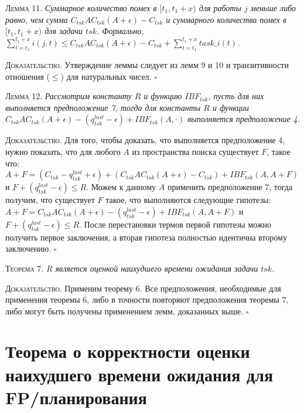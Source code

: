 \documentclass[14pt]{matmex-diploma-custom}
\begin{document}
\textsc{Лемма 11.}
\textit{Суммарное количество помех в $[t_1, t_1 + x)$ для работы $j$ меньше либо равно, 
 чем сумма $C_{tsk}AC_{tsk}(A + \epsilon) - C_{tsk}$ и 
   суммарного количества помех в $[t_1, t_1 + x)$ для задачи $tsk$. 
 Формально, 
   $\sum_{t = t_1}^{t_1 + x} i(j,t)  
     \leq C_{tsk}AC_{tsk}(A + \epsilon) - C_{tsk} +  \sum_{t = t_1}^{t_1 + x} task\_i(t)$. }

\textsc{Доказательство.} Утверждение леммы следует из лемм 9 и 10 и транзитивности отношения ($\leq$) для натуральных чисел. $\square$

\textsc{Лемма 12.}
\textit{Рассмотрим константу $R$ и функцию $IBF_{tsk}$, пусть для них выполняется предположение 7, 
  тогда для константы $R$ и функции $C_{tsk}AC_{tsk} (A + \epsilon) - (q_{tsk}^{last} - \epsilon) + IBF_{tsk}(A, \cdot)$ 
  выполняется предположение 4. } 
  
\textsc{Доказательство.} Для того, чтобы доказать, что выполняется предположение 4, нужно показать, 
  что для любого $A$ из пространства поиска существует $F$, такое что: 
    $A + F =  (C_{tsk} - q_{tsk}^{last} +\epsilon) +  (C_{tsk}AC_{tsk}(A + \epsilon) - C_{tsk}) + IBF_{tsk}(A, A + F)$ 
    и $F + (q_{tsk}^{last} - \epsilon) \leq R$.
  Можем к данному $A$ применить предположение 7, тогда получим, что существует $F$ такое, 
    что выполняются следующие гипотезы:
    $A + F = C_{tsk}AC_{tsk}(A + \epsilon) - (q_{tsk}^{last}- \epsilon) + IBF_{tsk}(A, A + F)$
    и $F + (q_{tsk}^{last}- \epsilon) \leq R$.
  После перестановки термов первой гипотезы можно получить первое заключения, 
  а вторая гипотеза полностью идентична второму заключению. $\square$

\textsc{Теорема 7.}
\textit{$R$ является оценкой наихудшего времени ожидания задачи $tsk$. }

\textsc{Доказательство.} Применим теорему 6. Все предположения, необходимые для 
  применения теоремы 6, либо в точности повторяют предположения теоремы 7,
  либо могут быть получены применением лемм, доказанных выше. $\square$



\section{Теорема о корректности оценки наихудшего времени ожидания для FP\-/планирования}
\end{document}
